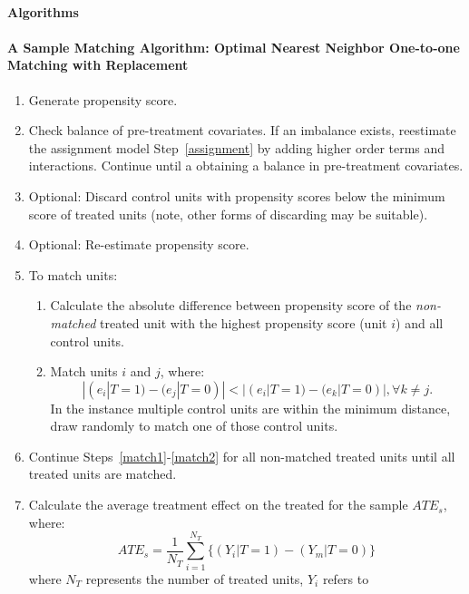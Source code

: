 \documentclass[11pt,titlepage]{article}
\begin{document}
\appendix
\paragraph{Algorithms}
\paragraph{A Sample Matching Algorithm: Optimal Nearest Neighbor One-to-one
Matching with Replacement}
\begin{enumerate}
\item Generate propensity score. \label{assignment}
\item Check balance of pre-treatment covariates.  If an imbalance
  exists, reestimate the assignment model Step~\ref{assignment} by adding
  higher order terms and interactions.  Continue until a obtaining a
  balance in pre-treatment covariates.  
\item Optional: Discard control units with propensity scores below the minimum
  score of treated units (note, other forms of discarding may be suitable).
\item Optional: Re-estimate propensity score.
\item To match units: \label{match}
  \begin{enumerate}
  \item Calculate the absolute difference between propensity
    score of the \emph{non-matched} treated unit with the highest propensity
    score (unit $i$) and all control units. \label{match1}
  \item Match units $i$ and $j$, where:
    \begin{equation}
      | (e_i | T=1)-(e_j | T=0) | < | (e_i | T=1)-(e_k | T=0) |,  \forall k \ne j.  
    \end{equation}
    In the instance multiple control units are
    within the minimum distance, draw randomly to match one of those
    control units. \label{match2}
  \end{enumerate}
\item Continue Steps~\ref{match1}-\ref{match2} for all non-matched
  treated units until all treated units
  are matched. \label{match3}
\item Calculate the average treatment effect on the treated for the
  sample $ATE_s$, where:
  \begin{equation}
    ATE_s=\frac{1}{N_T} \sum_{i=1}^{N_T} \big\{ (Y_i|T=1) - (Y_m|T=0)
    \big \}
  \end{equation}
where $N_T$ represents the number of treated units, $Y_i$ refers to

\end{enumerate}
\end{document}

